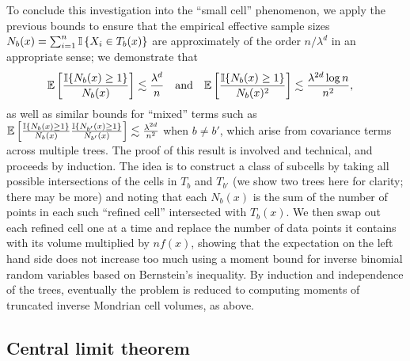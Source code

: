 To conclude this investigation into the ``small cell'' phenomenon, we apply the
previous bounds to ensure that the empirical effective sample sizes
$N_b(x) = \sum_{i=1}^{n} \mathbb{I} \left\{ X_i \in T_b(x) \right\}$ are approximately
of the order $n / \lambda^d$ in an appropriate sense; we demonstrate that
%
\begin{align*}
  \mathbb{E}\left[ \frac{\mathbb{I}\{N_b(x) \geq 1\}}{N_b(x)} \right]
  &\lesssim \frac{\lambda^d}{n}
  &&\text{and}
  &\mathbb{E}\left[ \frac{\mathbb{I}\{N_b(x) \geq 1\}}{N_b(x)^2} \right]
  &\lesssim \frac{\lambda^{2d} \log n}{n^2},
\end{align*}
%
as well as similar bounds for ``mixed'' terms such as
%
$\mathbb{E} \left[
  \frac{\mathbb{I}\{N_b(x) \geq 1\}}{N_b(x)}
  \frac{\mathbb{I}\{N_{b'}(x) \geq 1\}}{N_{b'}(x)}
\right]
\lesssim \frac{\lambda^{2d}}{n^2}$
%
when $b \neq b'$, which arise from covariance terms across multiple trees. The
proof of this result is involved and technical, and proceeds by induction. The
idea is to construct a class of subcells by taking all possible intersections
of the cells in $T_b$ and $T_{b'}$ (we show two trees here for clarity; there
may be more) and noting that each $N_b(x)$ is the sum of the number of points
in each such ``refined cell'' intersected with $T_b(x)$. We then swap out each
refined cell one at a time and replace the number of data points it contains
with its volume multiplied by $n f(x)$, showing that the expectation on the
left hand side does not increase too much using a moment bound for inverse
binomial random variables based on Bernstein's inequality. By induction and
independence of the trees, eventually the problem is reduced to computing
moments of truncated inverse Mondrian cell volumes, as above.

\subsection*{Central limit theorem}

